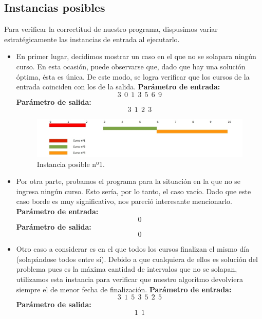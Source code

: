 \subsection{Instancias posibles}

Para verificar la correctitud de nuestro programa, dispusimos variar estratégicamente las instancias de entrada al ejecutarlo.
\begin{itemize}
\item En primer lugar, decidimos mostrar un caso en el que no se solapara ningún curso. En esta ocasión, puede observarse que, dado que hay una solución óptima, ésta es única. De este modo, se logra verificar que los cursos de la entrada coinciden con los de la salida.\newline
\textbf{Parámetro de entrada:} $$3\ \ 0\ \ 1\ \ 3\ \ 5\ \ 6\ \ 9$$
\textbf{Parámetro de salida:} $$3\ \ 1\ \ 2\ \ 3$$\newline


\begin{figure}[H] %
\begin{center}
\includegraphics[width=450pt]{../imgs/instancia4.jpg}
\end{center}
\caption{Instancia posible nº1.}
\end{figure}

\item Por otra parte, probamos el programa para la situación en la que no se ingresa ningún curso. Esto sería, por lo tanto, el caso vacío. Dado que este caso borde es muy significativo, nos pareció interesante mencionarlo.\newline
\textbf{Parámetro de entrada:} $$0$$
\textbf{Parámetro de salida:} $$0$$ \newline


\item Otro caso a considerar es en el que todos los cursos finalizan el mismo día (solapándose todos entre sí). Debido a que cualquiera de ellos es solución del problema pues es la máxima cantidad de intervalos que no se solapan, utilizamos esta instancia para verificar que nuestro algoritmo devolviera siempre el de menor fecha de finalización. \newline
\textbf{Parámetro de entrada:}  $$3\ \ 1\ \ 5\ \ 3\ \ 5\ \ 2\ \ 5$$
\textbf{Parámetro de salida:}  $$1\ \ 1$$\newline


\end{itemize}
